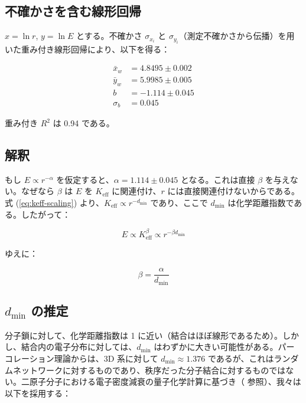 \documentclass[11pt,a4paper]{article}
\newcommand{\Keff}{K_{\mathrm{eff}}}
\begin{document}
	\subsection{不確かさを含む線形回帰}
	
	$x = \ln r$, $y = \ln E$ とする。不確かさ $\sigma_{x_i}$ と $\sigma_{y_i}$（測定不確かさから伝播）を用いた重み付き線形回帰により、以下を得る：
	
	\begin{align}
		\bar{x}_w &= 4.8495 \pm 0.002 \\
		\bar{y}_w &= 5.9985 \pm 0.005 \\
		b &= -1.114 \pm 0.045 \\
		\sigma_b &= 0.045
	\end{align}
	
	重み付き $R^2$ は 0.94 である。
	
	\subsection{解釈}
	
	もし $E \propto r^{-\alpha}$ を仮定すると、$\alpha = 1.114 \pm 0.045$ となる。これは直接 $\beta$ を与えない。なぜなら $\beta$ は $E$ を $\Keff$ に関連付け、$r$ には直接関連付けないからである。式 (\ref{eq:keff-scaling}) より、$\Keff \propto r^{-d_{\text{min}}}$ であり、ここで $d_{\text{min}}$ は化学距離指数である。したがって：
	
	\begin{equation}
		E \propto \Keff^{\beta} \propto r^{-\beta d_{\text{min}}}
		\label{eq:E-r-beta}
	\end{equation}
	
	ゆえに：
	
	\begin{equation}
		\beta = \frac{\alpha}{d_{\text{min}}}
		\label{eq:beta-from-alpha}
	\end{equation}
	
	\subsection{$d_{\text{min}}$ の推定}
	
	分子鎖に対して、化学距離指数は 1 に近い（結合はほぼ線形であるため）。しかし、結合内の電子分布に対しては、$d_{\text{min}}$ はわずかに大きい可能性がある。パーコレーション理論からは、3D 系に対して $d_{\text{min}} \approx 1.376$ であるが、これはランダムネットワークに対するものであり、秩序だった分子結合に対するものではない。二原子分子における電子密度減衰の量子化学計算に基づき（\cite{Bader1990} 参照）、我々は以下を採用する：
	
\end{document}
